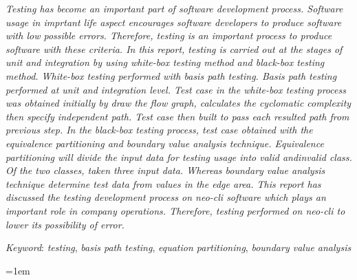 \documentclass{pkl}
\begin{document}
{\abstracteng

  \emph{Testing has become an important part of software development
    process. Software usage in imprtant life aspect encourages
    software developers to produce software with low possible errors.
    Therefore, testing is an important process to produce software
    with these criteria. In this report, testing is carried out at the
    stages of unit and integration by using white-box testing method
    and black-box testing method. White-box testing performed with
    basis path testing. Basis path testing performed at unit and
    integration level. Test case in the white-box testing process was
    obtained initially by draw the flow graph, calculates the
    cyclomatic complexity then specify independent path. Test case
    then built to pass each resulted path from previous step. In the
    black-box testing process, test case obtained with the equivalence
    partitioning and boundary value analysis technique. Equivalence
    partitioning will divide the input data for testing usage into
    valid andinvalid class. Of the two classes, taken three input
    data. Whereas boundary value analysis technique determine test
    data from values in the edge area. This report has discussed the
    testing development process on neo-cli software which plays an
    important role in company operations. Therefore, testing performed
    on neo-cli to lower its possibility of error.}

  \emph{Keyword}: \emph{testing}, \emph{basis path testing},
  \emph{equation partitioning}, \emph{boundary value analysis}
}

\tableofcontents
{}
\listoftables
{}
\listoffigures
{}
{}

\clearpage{}\setcounter{page}{1}








\emergencystretch=1em
\printbibliography[title={DAFTAR PUSTAKA}]


\end{document}
